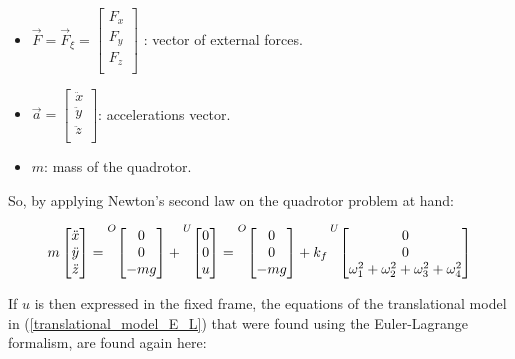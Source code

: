 \documentclass{thesisreport}
\begin{document}
\begin{itemize}
	\item $\overrightarrow{F}=\overrightarrow{F}_{\xi}=\begin{bmatrix}
F_x \\
F_y \\
F_z \\
\end{bmatrix}$ : vector of external forces.

\item $\overrightarrow{a} = \begin{bmatrix}
\ddot{x} \\
\ddot{y} \\
\ddot{z} \\
\end{bmatrix}$: accelerations vector.
\item $m$: mass of the quadrotor.
\end{itemize}

So, by applying Newton's second law on the quadrotor problem at hand:

\begin{equation*}
	m\begin{bmatrix}
	\ddot{x}\\
	\ddot{y}\\
	\ddot{z}\\
	\end{bmatrix} = \prescript{O}{}{\begin{bmatrix}
	0 \\
	0 \\
	-mg 
	\end{bmatrix}} + \prescript{U}{}{\begin{bmatrix}
	0 \\
	0 \\
	u 
	\end{bmatrix}} = \prescript{O}{}{\begin{bmatrix}
	0 \\
	0 \\
	-mg 
	\end{bmatrix}} + k_f \prescript{U}{}{\begin{bmatrix}
	0 \\
	0 \\
	\omega_1^2 + \omega_2^2 + \omega_3^2 + \omega_4^2
	\end{bmatrix}}
\end{equation*}


If $u$ is then expressed in the fixed frame, the equations of the translational model  in (\ref{translational_model_E_L}) that were found using the Euler-Lagrange formalism, are found again here:
\end{document}
